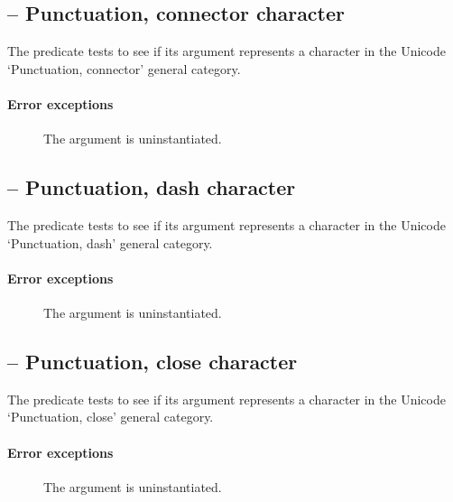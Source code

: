 \subsection{ -- Punctuation, connector character}
\label{chars:isPcChar}

The  predicate tests to see if its  argument represents a character in the Unicode `Punctuation, connector' general category. 
        
\paragraph{Error exceptions}
\begin{description}
\item[]
The argument is uninstantiated.
\end{description}

\subsection{ -- Punctuation, dash character}
\label{chars:isPdChar}

The  predicate tests to see if its  argument represents a character in the Unicode `Punctuation, dash' general category. 
        
\paragraph{Error exceptions}
\begin{description}
\item[]
The argument is uninstantiated.
\end{description}

\subsection{ -- Punctuation, close character}
\label{chars:isPeChar}

The  predicate tests to see if its  argument represents a character in the Unicode `Punctuation, close' general category. 
        
\paragraph{Error exceptions}
\begin{description}
\item[]
The argument is uninstantiated.
\end{description}

